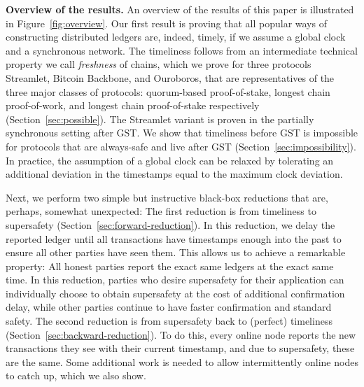 \noindent
\textbf{Overview of the results.}
An overview of the results of this paper is illustrated in Figure~\ref{fig:overview}.
Our first result is proving that all popular ways of constructing distributed ledgers
are, indeed, timely, if we assume a global clock and a synchronous network.
The timeliness follows from an intermediate technical property we call \emph{freshness}
of chains, which we prove for three protocols
Streamlet, Bitcoin Backbone, and Ouroboros, that are representatives
of the three major classes of protocols: quorum-based proof-of-stake, longest chain
proof-of-work, and longest chain proof-of-stake respectively (Section~\ref{sec:possible}).
The Streamlet variant is proven in the partially synchronous setting after GST.
We show that timeliness before GST is impossible for protocols that are always-safe
and live after GST (Section~\ref{sec:impossibility}).
In practice, the assumption of a global clock can be relaxed by tolerating an additional deviation in the timestamps equal to the maximum clock deviation.

Next, we perform two simple but instructive black-box reductions that are, perhaps, somewhat unexpected:
The first reduction is from timeliness to supersafety (Section~\ref{sec:forward-reduction}).
In this reduction, we delay the reported ledger until all
transactions have timestamps enough into the past to ensure all other parties have seen them.
This allows us to achieve a remarkable property: All honest parties report the
exact same ledgers at the exact same time.
In this reduction, parties who desire supersafety for their application can individually choose to obtain supersafety at the cost of additional confirmation delay, while other parties continue to have faster confirmation and standard safety.
The second reduction is from supersafety back to (perfect) timeliness (Section~\ref{sec:backward-reduction}).
To do this, every online node reports the new transactions they see with
their current timestamp, and due to supersafety, these are the same.
Some additional work is needed to allow intermittently online nodes to catch up, which we also show.

